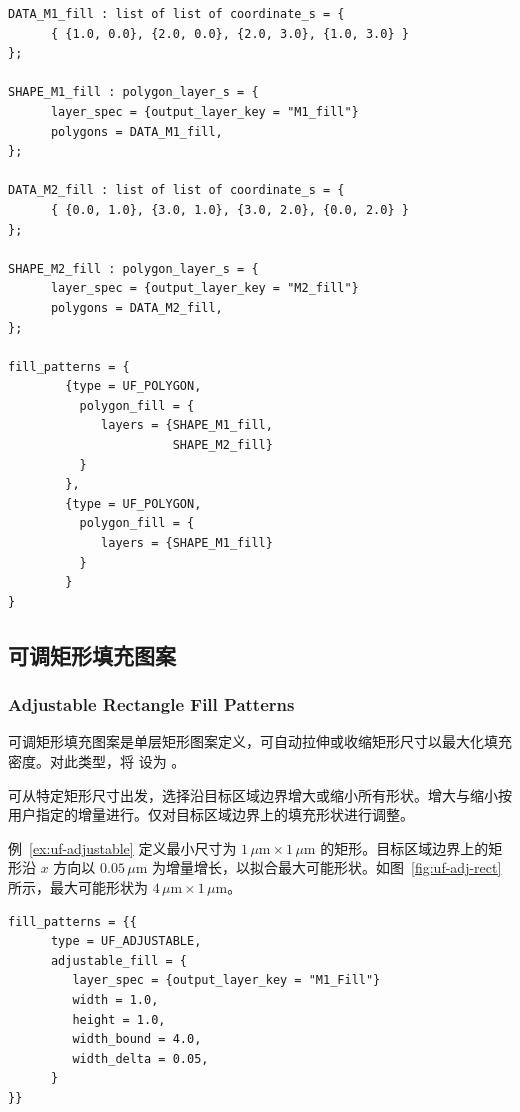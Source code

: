 \begin{lstlisting}[style=pxl,caption={使用 unified\_fill() 的 fill\_patterns 选项的多图案示例},label={ex:uf-multi-pat}]
DATA_M1_fill : list of list of coordinate_s = {
      { {1.0, 0.0}, {2.0, 0.0}, {2.0, 3.0}, {1.0, 3.0} }
};

SHAPE_M1_fill : polygon_layer_s = {
      layer_spec = {output_layer_key = "M1_fill"}
      polygons = DATA_M1_fill,
};

DATA_M2_fill : list of list of coordinate_s = {
      { {0.0, 1.0}, {3.0, 1.0}, {3.0, 2.0}, {0.0, 2.0} }
};

SHAPE_M2_fill : polygon_layer_s = {
      layer_spec = {output_layer_key = "M2_fill"}
      polygons = DATA_M2_fill,
};

fill_patterns = {
        {type = UF_POLYGON,
          polygon_fill = {
             layers = {SHAPE_M1_fill,
                       SHAPE_M2_fill}
          }
        },
        {type = UF_POLYGON,
          polygon_fill = {
             layers = {SHAPE_M1_fill}
          }
        }
}
\end{lstlisting}


\subsection{可调矩形填充图案}
\subsubsection*{Adjustable Rectangle Fill Patterns}

可调矩形填充图案是单层矩形图案定义，可自动拉伸或收缩矩形尺寸以最大化填充密度。对此类型，将  设为 。

可从特定矩形尺寸出发，选择沿目标区域边界增大或缩小所有形状。增大与缩小按用户指定的增量进行。仅对目标区域边界上的填充形状进行调整。

例~\ref{ex:uf-adjustable} 定义最小尺寸为 $1\,\mu\mathrm{m} \times 1\,\mu\mathrm{m}$ 的矩形。目标区域边界上的矩形沿 $x$ 方向以 $0.05\,\mu\mathrm{m}$ 为增量增长，以拟合最大可能形状。如图~\ref{fig:uf-adj-rect} 所示，最大可能形状为 $4\,\mu\mathrm{m} \times 1\,\mu\mathrm{m}$。

\begin{lstlisting}[style=pxl,caption={使用 UF\_ADJUSTABLE 类型的可调矩形填充图案示例},label={ex:uf-adjustable}]
fill_patterns = {{
      type = UF_ADJUSTABLE,
      adjustable_fill = {
         layer_spec = {output_layer_key = "M1_Fill"}
         width = 1.0,
         height = 1.0,
         width_bound = 4.0,
         width_delta = 0.05,
      }
}}
\end{lstlisting}

